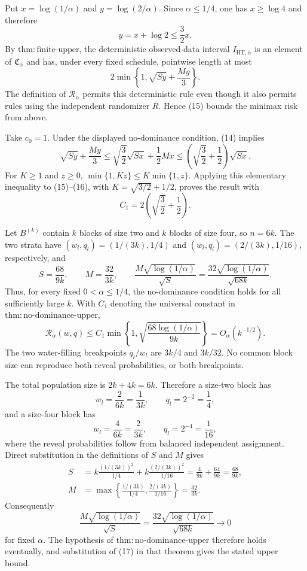 Put \(x=\log(1/\alpha)\) and \(y=\log(2/\alpha)\).  Since
\(\alpha\le1/4\), one has \(x\ge\log4\) and therefore
\[
 y=x+\log2\le\frac32x.
\tag{14}
\]
By \(\mathrm{thm{:}finite\text{-}upper}\), the deterministic
observed-data interval \(I_{\mathrm{HT},\alpha}\) is an element of
\(\mathfrak C_\alpha\) and has, under every fixed schedule, pointwise
length at most
\[
 2\min\left\{1,\sqrt{Sy}+\frac{My}{3}\right\}.
\tag{15}
\]
The definition of \(\mathcal R_\alpha\) permits this deterministic
rule even though it also permits rules using the independent
randomizer \(R\).  Hence (15) bounds the minimax risk from above.

Take \(c_0=1\).  Under the displayed no-dominance condition, (14)
implies
\[
 \sqrt{Sy}+\frac{My}{3}
 \le\sqrt{\frac32}\sqrt{Sx}+\frac12M x
 \le\left(\sqrt{\frac32}+\frac12\right)\sqrt{Sx}.
\tag{16}
\]
For \(K\ge1\) and \(z\ge0\),
\(\min\{1,Kz\}\le K\min\{1,z\}\).  Applying this elementary
inequality to (15)--(16), with
\(K=\sqrt{3/2}+1/2\), proves the result with
\[
 C_1=2\left(\sqrt{\frac32}+\frac12\right).
\]

Let \(B^{(k)}\) contain \(k\) blocks of size two and \(k\) blocks of
size four, so \(n=6k\).  The two strata have
\((w_l,q_l)=(1/(3k),1/4)\) and
\((w_l,q_l)=(2/(3k),1/16)\), respectively, and
\[
 S=\frac{68}{9k},\qquad M=\frac{32}{3k},\qquad
 \frac{M\sqrt{\log(1/\alpha)}}{\sqrt S}
 =\frac{32\sqrt{\log(1/\alpha)}}{\sqrt{68k}}.
\]
Thus, for every fixed \(0<\alpha\le1/4\), the no-dominance condition
holds for all sufficiently large \(k\).  With \(C_1\) denoting the
universal constant in
\(\mathrm{thm{:}no\text{-}dominance\text{-}upper}\),
\[
 \mathcal R_\alpha(w,q)
 \le C_1\min\left\{1,
       \sqrt{\frac{68\log(1/\alpha)}{9k}}\right\}
 =O_\alpha(k^{-1/2}).
\]
The two water-filling breakpoints \(q_l/w_l\) are \(3k/4\) and
\(3k/32\).  No common block size can reproduce both reveal
probabilities, or both breakpoints.

The total population size is \(2k+4k=6k\).  Therefore a size-two
block has
\[
 w_l=\frac2{6k}=\frac1{3k},\qquad q_l=2^{-2}=\frac14,
\]
and a size-four block has
\[
 w_l=\frac4{6k}=\frac2{3k},\qquad q_l=2^{-4}=\frac1{16},
\]
where the reveal probabilities follow from balanced independent
assignment.  Direct substitution in the definitions of \(S\) and
\(M\) gives
\[
\begin{aligned}
 S
 &=k\frac{(1/(3k))^2}{1/4}
   +k\frac{(2/(3k))^2}{1/16}
   =\frac4{9k}+\frac{64}{9k}
   =\frac{68}{9k},\\
 M
 &=\max\left\{\frac{1/(3k)}{1/4},
                \frac{2/(3k)}{1/16}\right\}
   =\frac{32}{3k}.
\end{aligned}
\tag{17}
\]
Consequently
\[
 \frac{M\sqrt{\log(1/\alpha)}}{\sqrt S}
 =\frac{32\sqrt{\log(1/\alpha)}}{\sqrt{68k}}
 \longrightarrow0
\tag{18}
\]
for fixed \(\alpha\).  The hypothesis of
\(\mathrm{thm{:}no\text{-}dominance\text{-}upper}\) therefore holds
eventually, and substitution of (17) in that theorem gives the stated
upper bound.

